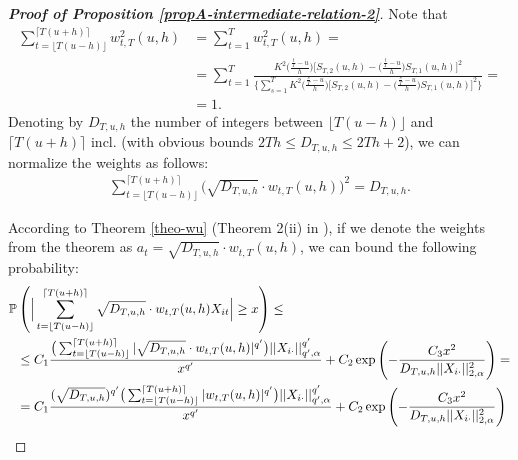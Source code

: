 \documentclass[a4paper,12pt]{article}
\begin{document}
\begin{proof}[\textnormal{\textbf{Proof of Proposition \ref{propA-intermediate-relation-2}}}]
Note that
\begin{align*}
\sum_{t=\lfloor T(u-h) \rfloor}^{\lceil T(u+h) \rceil} w^2_{t,T}(u,h) &= \sum_{t=1}^T w^2_{t,T}(u,h) =\\
&= \sum_{t=1}^T\frac{K^2\Big(\frac{\frac{t}{T}-u}{h}\Big) \Big[ S_{T,2}(u,h) - \Big(\frac{\frac{t}{T}-u}{h}\Big) S_{T,1}(u,h) \Big]^2}{ \bigg\{\sum\nolimits_{s=1}^T  K^2\Big(\frac{\frac{s}{T}-u}{h}\Big) \Big[ S_{T,2}(u,h) - \Big(\frac{\frac{s}{T}-u}{h}\Big) S_{T,1}(u,h) \Big]^2 \bigg\} } =\\
&= 1.
\end{align*}
Denoting by $D_{T, u, h}$ the number of integers between $\lfloor T(u-h) \rfloor$ and $\lceil T(u+h) \rceil$ incl. (with obvious bounds $2Th \leq D_{T, u, h} \leq 2Th + 2$), we can normalize the weights as follows:
\begin{align*}
\sum_{t=\lfloor T(u-h) \rfloor}^{\lceil T(u+h) \rceil} \big(\sqrt{D_{T, u, h}}\cdot w_{t,T}(u,h)\big)^2 = D_{T, u, h}.
\end{align*}

According to Theorem \ref{theo-wu} (Theorem 2(ii) in \cite{Wu2016}), if we denote the weights from the theorem as $a_t = \sqrt{D_{T, u, h}}\cdot w_{t,T}(u,h)$, we can bound the following probability:
\begin{align*}
\mathbb{P}&\left(\Big| \sum_{t=\lfloor T(u-h) \rfloor}^{\lceil T(u+h) \rceil} \sqrt{D_{T, u, h}}\cdot w_{t,T}(u,h)X_{it}  \Big| \geq x\right) \leq\\
&\leq C_1 \frac{\big( \sum_{t=\lfloor T(u-h) \rfloor}^{\lceil T(u+h) \rceil} |\sqrt{D_{T, u, h}}\cdot w_{t,T}(u,h)|^{q^\prime}\big) ||X_{i\cdot}||^{q^\prime}_{q^\prime, \alpha}}{ x^{q^\prime}} + C_2 \exp \left(-\frac{C_3  x^2}{D_{T, u, h}||X_{i\cdot}||^{2}_{2, \alpha}}\right)=\\
&= C_1 \frac{(\sqrt{D_{T, u, h}})^{q^\prime}\big( \sum_{t=\lfloor T(u-h) \rfloor}^{\lceil T(u+h) \rceil} |w_{t,T}(u,h)|^{q^\prime}\big) ||X_{i\cdot}||^{q^\prime}_{q^\prime, \alpha}}{ x^{q^\prime}} + C_2 \exp \left(-\frac{C_3  x^2}{D_{T, u, h}||X_{i\cdot}||^{2}_{2, \alpha}}\right)  
\end{align*}


\end{proof}
\end{document}
